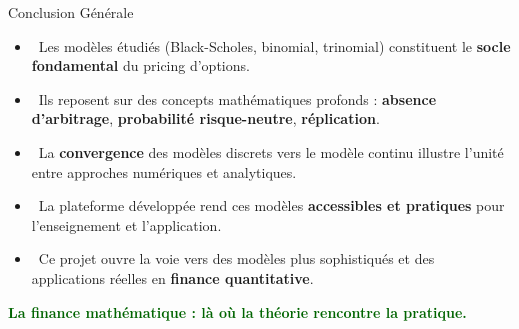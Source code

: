 \documentclass[aspectratio=169, 10pt]{beamer}
\begin{document}
\begin{frame}{Conclusion Générale}
    \begin{itemize}
        \item {} \ Les modèles étudiés (Black-Scholes, binomial, trinomial) constituent le \textbf{socle fondamental} du pricing d'options.
        
        \item {} \ Ils reposent sur des concepts mathématiques profonds : \textbf{absence d'arbitrage}, \textbf{probabilité risque-neutre}, \textbf{réplication}.
        
        \item {} \ La \textbf{convergence} des modèles discrets vers le modèle continu illustre l'unité entre approches numériques et analytiques.
        
        \item {} \ La plateforme développée rend ces modèles \textbf{accessibles et pratiques} pour l'enseignement et l'application.
        
        \item {} \ Ce projet ouvre la voie vers des modèles plus sophistiqués et des applications réelles en \textbf{finance quantitative}.
    \end{itemize}
    
    \vspace{0.5cm}
    \begin{center}
        \textcolor{darkGreen}{\textbf{La finance mathématique : là où la théorie rencontre la pratique.}}
    \end{center}
\end{frame}
\end{document}

